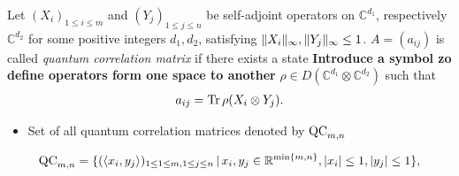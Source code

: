 \begin{frame}
	\begin{definition}
		Let $ (X_i)_{1 \le i \le m } $ and $ (Y_j)_{1 \le j \le n} $ be self-adjoint operators on $ \mathbb{C}^{d_1} $, respectively $ \mathbb{C}^{d_2} $ for some positive integers $ d_1,d_2 $, satisfying $  \Vert {X_i} \Vert_{\infty},  \Vert {Y_j} \Vert_{\infty} \le 1 $. $ A = (a_{ij}) $ is called {\itshape quantum correlation matrix} if there exists a state \textbf{Introduce a symbol zo define operators form one space to another} $ \rho \in D(\mathbb{C}^{d_1} \otimes \mathbb{C}^{d_2})$ such that 
		\begin{align*}\label{QCaij}
		a_{ij} = \text{Tr} \, {\rho (X_i \otimes Y_j)} .
		\end{align*}
	\end{definition}
	\pause
	\begin{itemize}
		\item Set of all quantum correlation matrices denoted by $ \textup{QC}_{m,n} $
	\end{itemize}
	\begin{lemma}
		\begin{align*}
		\textup{QC}_{m,n} = \{ (\langle x_i,y_j \rangle)_{1 \le 1 \le m, 1 \le j \le n} \,| \, x_i,y_j \in \mathbb{R}^{ \min \{m,n \} }, \vert x_i  \vert \le 1, \vert y_j \vert \le 1  \},
		\end{align*}
	\end{lemma}
\end{frame}

